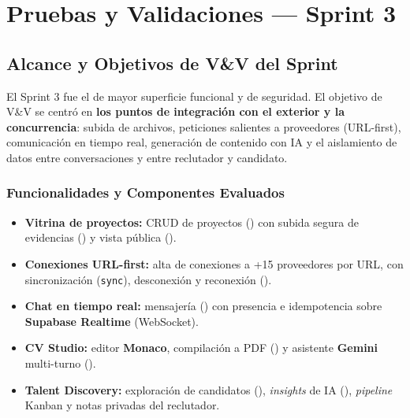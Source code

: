 \chapter{Pruebas y Validaciones — Sprint 3}
\label{ch:sprint3}

\section{Alcance y Objetivos de V\&V del Sprint}
\label{sec:s3-alcance}

El Sprint 3 fue el de mayor superficie funcional y de seguridad. El objetivo de V\&V se
centró en \textbf{los puntos de integración con el exterior y la concurrencia}: subida de
archivos, peticiones salientes a proveedores (URL-first), comunicación en tiempo real,
generación de contenido con IA y el aislamiento de datos entre conversaciones y entre
reclutador y candidato.

\subsection{Funcionalidades y Componentes Evaluados}
\label{sec:s3-funcionalidades}

\begin{itemize}
    \item \textbf{Vitrina de proyectos:} CRUD de proyectos
    () con subida segura de evidencias () y vista
    pública ().
    \item \textbf{Conexiones URL-first:} alta de conexiones a +15 proveedores por URL, con
    sincronización (\texttt{sync}), desconexión y reconexión
    ().
    \item \textbf{Chat en tiempo real:} mensajería () con presencia
    e idempotencia sobre \textbf{Supabase Realtime} (WebSocket).
    \item \textbf{CV Studio:} editor \textbf{Monaco}, compilación a PDF
    () y asistente \textbf{Gemini} multi-turno
    ().
    \item \textbf{Talent Discovery:} exploración de candidatos
    (), \textit{insights} de IA (), \textit{pipeline}
    Kanban y notas privadas del reclutador.
\end{itemize}

